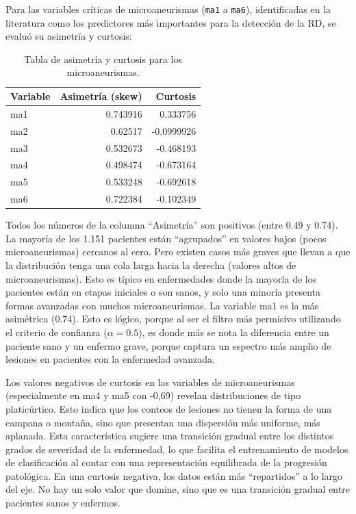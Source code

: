 Para las variables críticas de microaneurismas (\texttt{ma1} a \texttt{ma6}), identificadas en la literatura \parencite{casanova2014application} como los predictores más importantes para la detección de la RD, se evaluó su asimetría y curtosis:

\begin{table}[htbp]
\centering
\caption{Tabla de asimetría y curtosis para los microaneurismas.}
\begin{tabular}{lrr}
\toprule
Variable & Asimetría (skew) & Curtosis \\
\midrule
ma1 & 0.743916 &  0.333756  \\
ma2 & 0.62517  & -0.0999926 \\
ma3 & 0.532673 & -0.468193  \\
ma4 & 0.498474 & -0.673164  \\
ma5 & 0.533248 & -0.692618  \\
ma6 & 0.722384 & -0.102349  \\
\bottomrule
\end{tabular}
\end{table}


Todos los números de la columna \enquote{Asimetría} son positivos (entre 0.49 y 0.74). La mayoría de los 1.151 pacientes están \enquote{agrupados} en valores bajos (pocos microaneurismas) cercanos al cero. Pero existen casos más graves que llevan a que la distribución tenga una cola larga hacia la derecha (valores altos de microaneurismas). Esto es típico en enfermedades donde la mayoría de los pacientes están en etapas iniciales o son sanos, y solo una minoría presenta formas avanzadas con muchos microaneurismas.
La variable ma1 es la más asimétrica (0.74). Esto es lógico, porque al ser el filtro más permisivo utilizando el criterio de confianza (\(\alpha=0.5\)), es donde más se nota la diferencia entre un paciente sano y un enfermo grave, porque captura un espectro más amplio de lesiones en pacientes con la enfermedad avanzada.

Los valores negativos de curtosis en las variables de microaneurismas (especialmente en ma4 y ma5 con -0,69) revelan distribuciones de tipo platicúrtico. Esto indica que los conteos de lesiones no tienen la forma de una campana o montaña, sino que presentan una dispersión más uniforme, más aplanada. Esta característica sugiere una transición gradual entre los distintos grados de severidad de la enfermedad, lo que facilita el entrenamiento de modelos de clasificación al contar con una representación equilibrada de la progresión patológica. En una curtosis negativa, los datos están más \enquote{repartidos} a lo largo del eje. No hay un solo valor que domine, sino que es una transición gradual entre pacientes sanos y enfermos.

